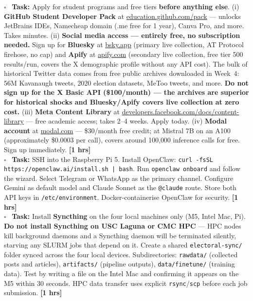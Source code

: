 \documentclass[11pt]{article}
\newcommand{\hrs}[1]{\textbf{[#1 hrs]}}
\newcommand{\task}[2]{%
  \noindent\textbf{Task:} #1 \hfill \hrs{#2}\\}
\newcommand{\done}{\textcolor{sectionblue}{$\square$}\ }
\begin{document}
\begin{taskbox}
\done \task{Apply for student programs and free tiers \textbf{before anything else}.
  (i) \textbf{GitHub Student Developer Pack} at \url{education.github.com/pack}
  --- unlocks JetBrains IDEs, Namecheap domain (.me free for 1 year),
  Canva Pro, and more. Takes minutes.
  (ii) \textbf{Social media access --- entirely free, no subscription needed.}
  Sign up for \textbf{Bluesky} at \url{bsky.app} (primary live collection,
  AT Protocol firehose, no cap) and \textbf{Apify} at \url{apify.com}
  (secondary live collection, free tier 500 results/run, covers the X
  demographic profile without any API cost). The bulk of historical Twitter
  data comes from free public archives downloaded in Week~4: 56M Kavanaugh
  tweets, 2020 election datasets, MeToo tweets, and more.
  \textbf{Do not sign up for the X Basic API (\$100/month) --- the archives
  are superior for historical shocks and Bluesky/Apify covers live
  collection at zero cost.}
  (iii) \textbf{Meta Content Library} at
  \url{developers.facebook.com/docs/content-library} --- free academic access;
  takes 2--4 weeks. Apply today.
  (iv) \textbf{Modal account} at \url{modal.com} --- \$30/month free credit;
  at Mistral 7B on an A100 (approximately \$0.0003 per call), covers around
  100{,}000 inference calls for free. Sign up immediately.}{1}

\done \task{SSH into the Raspberry Pi 5. Install OpenClaw:
  \texttt{curl -fsSL https://openclaw.ai/install.sh | bash}. Run
  \texttt{openclaw onboard} and follow the wizard. Select Telegram or
  WhatsApp as the primary channel. Configure Gemini as default model and
  Claude Sonnet as the \texttt{@claude} route. Store both API keys in
  \texttt{/etc/environment}. Docker-containerise OpenClaw for security.}{1}

\done \task{Install \textbf{Syncthing} on the four local machines only
  (M5, Intel Mac, Pi). \textbf{Do not install Syncthing on USC Laguna or CMC HPC}
  --- HPC nodes kill background daemons and a Syncthing daemon will be
  terminated silently, starving any SLURM jobs that depend on it. Create a
  shared \texttt{electoral-sync/} folder synced across the four local devices.
  Subdirectories: \texttt{rawdata/} (collected posts and articles),
  \texttt{artifacts/} (pipeline outputs), \texttt{data/finetune/} (training
  data). Test by writing a file on the Intel Mac and confirming it appears
  on the M5 within 30 seconds. HPC data transfer uses explicit
  \texttt{rsync}/\texttt{scp} before each job submission.}{1}


\end{taskbox}
\end{document}
